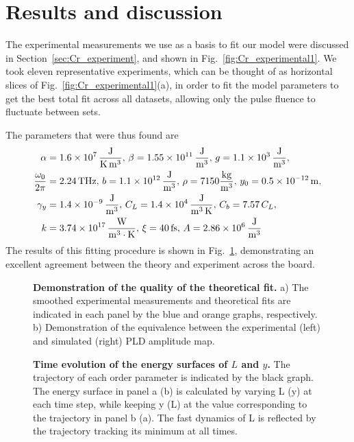 \section{Results and discussion \label{sec:Cr_results}}
The experimental measurements we use as a basis to fit our model were discussed in Section~\ref{sec:Cr_experiment}, and shown in Fig.~\ref{fig:Cr_experimental1}.
We took eleven representative experiments, which can be thought of as horizontal slices of Fig.~\ref{fig:Cr_experimental1}(a), in order to fit the model parameters to get the best total fit across all datasets, allowing only the pulse fluence to fluctuate between sets.

The parameters that were thus found are
\begin{align}
	\alpha &= \SI{1.6e7} {\rm \frac{J}{K\, m^3}},\, \beta = \SI{1.55e11} {\rm \frac{J}{m^3}},\, g = \SI{1.1e3}{\rm \frac{J}{m^3}}, \\
	\frac{\omega_0}{2\pi} &= 2.24\, {\rm THz},\, b = \SI{1.1e12} {\rm \frac{J}{m^3}},\, \rho = 7150 {\rm \frac{kg}{m^3}},\, y_0 = \SI{0.5e-12} {\rm m},\\
	\gamma_y &= \SI{1.4e-9}{\rm \frac{J}{m^3}}, \, C_L = \SI{1.4e4}{\rm \frac{J}{m^3\,K}},\, C_b = 7.57\,C_L,\\
	k &= \SI{3.74e17} {\rm \frac{W}{m^3\cdot K}},\, \xi = 40\,{\rm fs},\,A = \SI{2.86e6}{\rm \frac{J}{m^3}}
\end{align}
The results of this fitting procedure is shown in Fig.~\ref{fig:Cr_theoretical_fit}, demonstrating an excellent agreement between the theory and experiment across the board.
\begin{figure}
\caption{\label{fig:Cr_theoretical_fit} {\bf Demonstration of the quality of the theoretical fit.} a) The smoothed experimental measurements and theoretical fits are indicated in each panel by the blue and orange graphs, respectively. b) Demonstration of the equivalence between the experimental (left) and simulated (right) PLD amplitude map.}
\end{figure}
\begin{figure}
	\centering
	\caption{\label{fig:Cr_energy_surfaces}{\bf Time evolution of the energy surfaces of $L$ and $y$.} The trajectory of each order parameter is indicated by the black graph. The energy surface in panel a (b) is calculated by varying L (y) at each time step, while keeping y (L) at the value corresponding to the trajectory in panel b (a). The fast dynamics of L is reflected by the trajectory tracking its minimum at all times.}
\end{figure}

